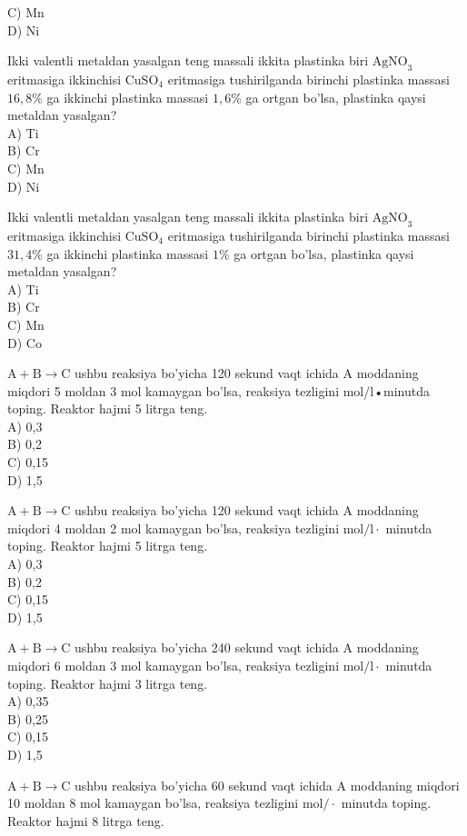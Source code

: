 C) Mn\\
D) Ni
  \item Ikki valentli metaldan yasalgan teng massali ikkita plastinka biri $\mathrm{AgNO}_{3}$ eritmasiga ikkinchisi $\mathrm{CuSO}_{4}$ eritmasiga tushirilganda birinchi plastinka massasi $16,8 \%$ ga ikkinchi plastinka massasi $1,6 \%$ ga ortgan bo'lsa, plastinka qaysi metaldan yasalgan?\\
A) Ti\\
B) Cr\\
C) Mn\\
D) Ni
  \item Ikki valentli metaldan yasalgan teng massali ikkita plastinka biri $\mathrm{AgNO}_{3}$ eritmasiga ikkinchisi $\mathrm{CuSO}_{4}$ eritmasiga tushirilganda birinchi plastinka massasi $31,4 \%$ ga ikkinchi plastinka massasi $1 \%$ ga ortgan bo'lsa, plastinka qaysi metaldan yasalgan?\\
A) Ti\\
B) Cr\\
C) Mn\\
D) Co
  \item $\mathrm{A}+\mathrm{B} \rightarrow \mathrm{C}$ ushbu reaksiya bo'yicha 120 sekund vaqt ichida A moddaning miqdori 5 moldan 3 mol kamaygan bo'lsa, reaksiya tezligini mol/l•minutda toping. Reaktor hajmi 5 litrga teng.\\
A) 0,3\\
B) 0,2\\
C) 0,15\\
D) 1,5
  \item $\mathrm{A}+\mathrm{B} \rightarrow \mathrm{C}$ ushbu reaksiya bo'yicha 120 sekund vaqt ichida A moddaning miqdori 4 moldan 2 mol kamaygan bo'lsa, reaksiya tezligini $\mathrm{mol} / \mathrm{l} \cdot$ minutda toping. Reaktor hajmi 5 litrga teng.\\
A) 0,3\\
B) 0,2\\
C) 0,15\\
D) 1,5
  \item $\mathrm{A}+\mathrm{B} \rightarrow \mathrm{C}$ ushbu reaksiya bo'yicha 240 sekund vaqt ichida A moddaning miqdori 6 moldan 3 mol kamaygan bo'lsa, reaksiya tezligini $\mathrm{mol} / \mathrm{l} \cdot$ minutda toping. Reaktor hajmi 3 litrga teng.\\
A) 0,35\\
B) 0,25\\
C) 0,15\\
D) 1,5
  \item $\mathrm{A}+\mathrm{B} \rightarrow \mathrm{C}$ ushbu reaksiya bo'yicha 60 sekund vaqt ichida A moddaning miqdori 10 moldan 8 mol kamaygan bo'lsa, reaksiya tezligini $\mathrm{mol} / \cdot$ minutda toping. Reaktor hajmi 8 litrga teng.\\
